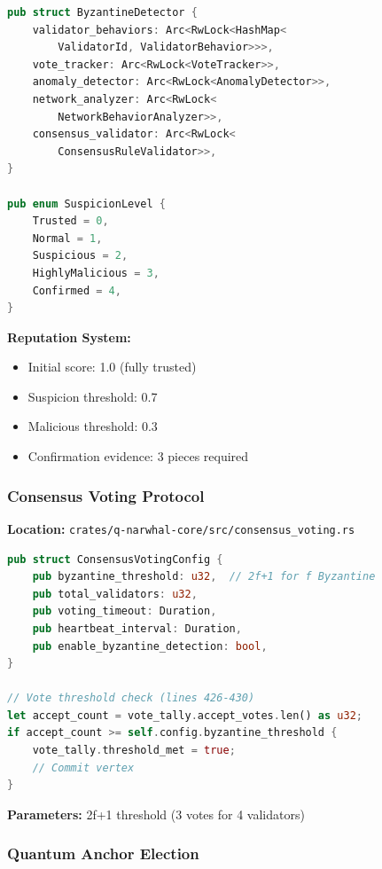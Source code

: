 \documentclass[11pt,a4paper]{article}
\begin{document}
\begin{lstlisting}[language=Rust,caption={Byzantine Detection System}]
pub struct ByzantineDetector {
    validator_behaviors: Arc<RwLock<HashMap<
        ValidatorId, ValidatorBehavior>>>,
    vote_tracker: Arc<RwLock<VoteTracker>>,
    anomaly_detector: Arc<RwLock<AnomalyDetector>>,
    network_analyzer: Arc<RwLock<
        NetworkBehaviorAnalyzer>>,
    consensus_validator: Arc<RwLock<
        ConsensusRuleValidator>>,
}

pub enum SuspicionLevel {
    Trusted = 0,
    Normal = 1,
    Suspicious = 2,
    HighlyMalicious = 3,
    Confirmed = 4,
}
\end{lstlisting}

\textbf{Reputation System:}
\begin{itemize}
    \item Initial score: 1.0 (fully trusted)
    \item Suspicion threshold: 0.7
    \item Malicious threshold: 0.3
    \item Confirmation evidence: 3 pieces required
\end{itemize}

\subsubsection{Consensus Voting Protocol}

\textbf{Location:} \texttt{crates/q-narwhal-core/src/consensus\_voting.rs}

\begin{lstlisting}[language=Rust,caption={BFT Voting Configuration}]
pub struct ConsensusVotingConfig {
    pub byzantine_threshold: u32,  // 2f+1 for f Byzantine
    pub total_validators: u32,
    pub voting_timeout: Duration,
    pub heartbeat_interval: Duration,
    pub enable_byzantine_detection: bool,
}

// Vote threshold check (lines 426-430)
let accept_count = vote_tally.accept_votes.len() as u32;
if accept_count >= self.config.byzantine_threshold {
    vote_tally.threshold_met = true;
    // Commit vertex
}
\end{lstlisting}

\textbf{Parameters:} 2f+1 threshold (3 votes for 4 validators)

\subsubsection{Quantum Anchor Election}
\end{document}
